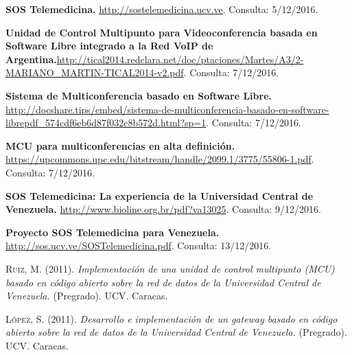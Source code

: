 \documentclass[12pt,letterpaper]{article}
\begin{document}
\begin{thebibliography}{10}
\textbf{SOS Telemedicina.} \textcolor{blue}{\small{\url{http://sostelemedicina.ucv.ve}}}. Consulta: 5/12/2016.

\textbf{Unidad de Control Multipunto para Videoconferencia basada en Software Libre integrado a la Red VoIP de Argentina.}\textcolor{blue}{\small{\url{http://tical2014.redclara.net/doc/ptaciones/Martes/A3/2-MARIANO_MARTIN-TICAL2014-v2.pdf}}}. Consulta: 7/12/2016.

\textbf{Sistema de Multiconferencia basado en Software Libre.} \textcolor{blue}{\small {\url{http://docshare.tips/embed/sistema-de-multiconferencia-basado-en-software-librepdf_574cdf6eb6d87f032c8b572d.html?sp=1}}}. Consulta: 7/12/2016.

\textbf{MCU para multiconferencias en alta definición.} \textcolor{blue}{\small{\url{https://upcommons.upc.edu/bitstream/handle/2099.1/3775/55806-1.pdf}}}. Consulta: 7/12/2016.

\textbf{SOS Telemedicina: La experiencia de la Universidad Central de Venezuela.} \textcolor{blue}{\small {\url{http://www.bioline.org.br/pdf?va13025}}}. Consulta: 9/12/2016.

\textbf{Proyecto SOS Telemedicina para Venezuela.} \textcolor{blue}{\small {\url{http://sos.ucv.ve/SOSTelemedicina.pdf}}}. Consulta: 13/12/2016.

\textsc{Ruiz, M.} (2011). \textit{Implementación de una unidad de control multipunto (MCU) basado en código abierto sobre la red de datos de la Universidad Central de Venezuela.} (Pregrado). UCV. Caracas. 

\textsc{López, S.} (2011). \textit{Desarrollo e implementación de un gateway basado en código abierto sobre la red de datos de la Universidad Central de Venezuela.} (Pregrado). UCV. Caracas. 
\end{thebibliography}



\end{document}
